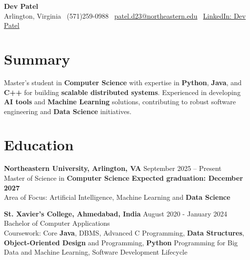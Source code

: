 \documentclass[a4paper,10pt]{article}
\begin{document}
\begin{center}
\vspace{-3mm}
    \fontsize{16}{18}\selectfont \textbf{Dev Patel} \\
    \vspace{0mm}
    \normalsize Arlington, Virginia \textbar\ (571)259-0988  \textbar\       \href{mailto:patel.d23@northeastern.edu}{patel.d23@northeastern.edu} \textbar\ \href{https://www.linkedin.com/in/devxpatel//}{LinkedIn: Dev Patel} \\
\end{center}

\section*{Summary}
Master's student in \textbf{Computer Science} with expertise in \textbf{Python}, \textbf{Java}, and \textbf{C++} for building \textbf{scalable distributed systems}. Experienced in developing \textbf{AI tools} and \textbf{Machine Learning} solutions, contributing to robust software engineering and \textbf{Data Science} initiatives.
 
\vspace{0mm}
\section*{Education}
\textbf{Northeastern University, Arlington, VA} \hfill September 2025 -- Present\\
Master of Science in \textbf{Computer Science} \hfill \textbf{Expected graduation: December 2027} \\
Area of Focus: Artificial Intelligence, Machine Learning and \textbf{Data Science}

\vspace{1mm} %
\textbf{St. Xavier's College, Ahmedabad, India} \hfill August 2020 - January 2024 \\
Bachelor of Computer Applications\\
Coursework: Core \textbf{Java}, DBMS, Advanced C Programming, \textbf{Data Structures}, \textbf{Object-Oriented Design} and Programming, \textbf{Python} Programming for Big Data and Machine Learning, Software Development Lifecycle
\end{document}

